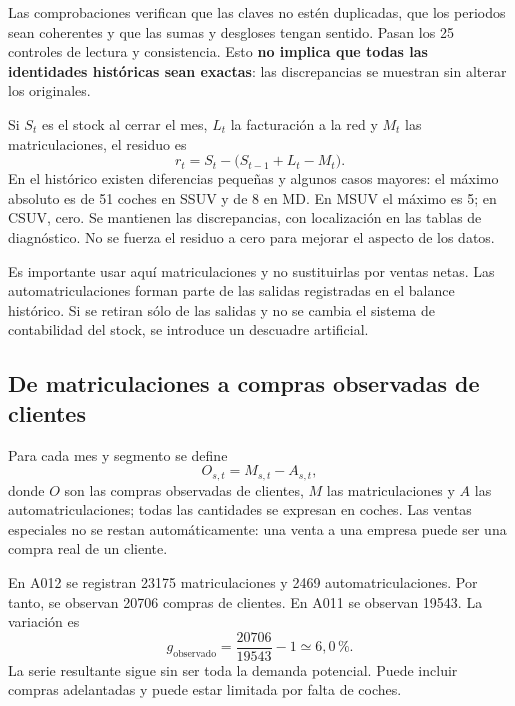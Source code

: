 Las comprobaciones verifican que las claves no estén duplicadas, que los periodos
sean coherentes y que las sumas y desgloses tengan sentido. Pasan los 25 controles
de lectura y consistencia. Esto \textbf{no implica que todas las identidades
históricas sean exactas}: las discrepancias se muestran sin alterar los originales.

Si $S_t$ es el stock al cerrar el mes, $L_t$ la facturación a la red y $M_t$ las
matriculaciones, el residuo es
\begin{equation}
 r_t=S_t-\bigl(S_{t-1}+L_t-M_t\bigr).
\end{equation}
En el histórico existen diferencias pequeñas y algunos casos mayores: el máximo
absoluto es de 51 coches en SSUV y de 8 en MD. En MSUV el máximo es 5; en CSUV,
cero. Se mantienen las discrepancias, con localización en las tablas de diagnóstico.
No se fuerza el residuo a cero para mejorar el aspecto de los datos.


Es importante usar aquí matriculaciones y no sustituirlas por ventas netas. Las
automatriculaciones forman parte de las salidas registradas en el balance
histórico. Si se retiran sólo de las salidas y no se cambia el sistema de
contabilidad del stock, se introduce un descuadre artificial.

\subsection{De matriculaciones a compras observadas de clientes}
Para cada mes y segmento se define
\begin{equation}\label{eq:neto}
 O_{s,t}=M_{s,t}-A_{s,t},
\end{equation}
donde $O$ son las compras observadas de clientes, $M$ las matriculaciones y $A$
las automatriculaciones; todas las cantidades se expresan en coches. Las ventas
especiales no se restan automáticamente: una venta a una empresa puede ser una
compra real de un cliente.

En A012 se registran \num{23175} matriculaciones y \num{2469}
automatriculaciones. Por tanto, se observan \num{20706} compras de clientes.
En A011 se observan \num{19543}. La variación es
\begin{equation}
 g_{\mathrm{observado}}=
 \frac{\num{20706}}{\num{19543}}-1\simeq 6{,}0\,\%.
\end{equation}
La serie resultante sigue sin ser toda la demanda potencial. Puede incluir
compras adelantadas y puede estar limitada por falta de coches.

